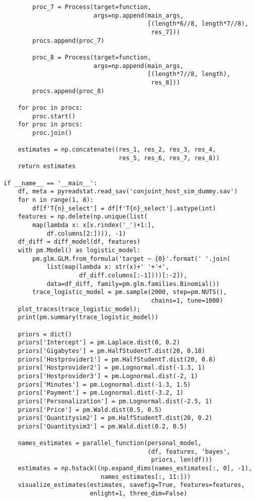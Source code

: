 \documentclass[a4paper, 12pt]{extreport}
\begin{document}
\begin{verbatim}
        proc_7 = Process(target=function,
                         args=np.append(main_args,
                                        [(length*6//8, length*7//8),
                                         res_7]))
        procs.append(proc_7)

        proc_8 = Process(target=function,
                         args=np.append(main_args,
                                        [(length*7//8, length),
                                         res_8]))
        procs.append(proc_8)

    for proc in procs:
        proc.start()
    for proc in procs:
        proc.join()

    estimates = np.concatenate((res_1, res_2, res_3, res_4,
                                res_5, res_6, res_7, res_8))
    return estimates

if __name__ == '__main__':
    df, meta = pyreadstat.read_sav('conjoint_host_sim_dummy.sav')
    for n in range(1, 8):
        df[f'T{n}_select'] = df[f'T{n}_select'].astype(int)
    features = np.delete(np.unique(list(
        map(lambda x: x[x.rindex('_')+1:],
            df.columns[2:]))), -1)
    df_diff = diff_model(df, features)
    with pm.Model() as logistic_model:
        pm.glm.GLM.from_formula('target ~ {0}'.format(' '.join(
            list(map(lambda x: str(x)+' '+'+',
                     df_diff.columns[:-1])))[:-2]),
            data=df_diff, family=pm.glm.families.Binomial())
        trace_logistic_model = pm.sample(2000, step=pm.NUTS(),
                                         chains=1, tune=1000)
    plot_traces(trace_logistic_model);
    print(pm.summary(trace_logistic_model))

    priors = dict()
    priors['Intercept'] = pm.Laplace.dist(0, 0.2)
    priors['Gigabytes'] = pm.HalfStudentT.dist(20, 0.18)
    priors['Hostprovider1'] = pm.HalfStudentT.dist(20, 0.8)
    priors['Hostprovider2'] = pm.Lognormal.dist(-1.3, 1)
    priors['Hostprovider3'] = pm.Lognormal.dist(-2, 1)
    priors['Minutes'] = pm.Lognormal.dist(-1.3, 1.5)
    priors['Payment'] = pm.Lognormal.dist(-3.2, 1)
    priors['Personalization'] = pm.Lognormal.dist(-2.5, 1)
    priors['Price'] = pm.Wald.dist(0.5, 0.5)
    priors['Quantitysim2'] = pm.HalfStudentT.dist(20, 0.2)
    priors['Quantitysim3'] = pm.Wald.dist(0.2, 0.5)

    names_estimates = parallel_function(personal_model,
                                        (df, features, 'bayes',
                                         priors, len(df)))
    estimates = np.hstack((np.expand_dims(names_estimates[:, 0], -1),
                           names_estimates[:, 11:]))
    visualize_estimates(estimates, savefig=True, features=features,
                        enlight=1, three_dim=False)
\end{verbatim}
\end{document}
